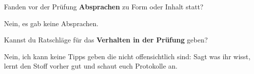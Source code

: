 \documentclass[a4paper]{article}
\begin{document}
\begin{multicols}{2}
   Fanden vor der Prüfung \textbf{Absprachen} zu Form oder Inhalt statt? \\
  \begin{minipage}[t][7cm]{\linewidth}
    Nein, es gab keine Absprachen.

  \end{minipage}

   Kannst du Ratschläge für das \textbf{Verhalten in der Prüfung} geben? \\
  \begin{minipage}[t][6.8cm]{\linewidth}
    Nein, ich kann keine Tipps geben die nicht offensichtlich sind:
    Sagt was ihr wisst, lernt den Stoff vorher gut und schaut euch Protokolle
    an.
  \end{minipage}
%
\end{multicols}
\clearpage
\end{document}
